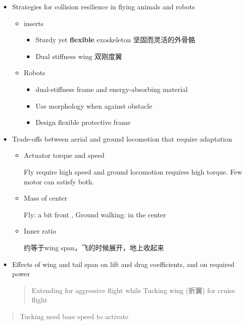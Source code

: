 \documentclass[]{article}
\begin{document}
\begin{itemize}
\item
  Strategies for collision resilience in flying animals and robots

  \begin{itemize}
  \item
    inserts

    \begin{itemize}
    \item
      Sturdy yet \textbf{flexible} exoskeleton \textbar{}
      坚固而灵活的外骨骼
    \item
      Dual stiffness wing \textbar{} 双刚度翼
    \end{itemize}
  \item
    Robots

    \begin{itemize}
    \item
      dual-stiffness frame and energy-absorbing material
    \item
      Use morphology when against obstacle
    \item
      Design flexible protective frame
    \end{itemize}
  \end{itemize}
\item
  Trade-offs between aerial and ground locomotion that require
  adaptation

  \begin{itemize}
  \item
    Actuator torque and speed

    Fly require high speed and ground locomotion requires high torque.
    Few motor can satisfy both.
  \item
    Mass of center

    Fly: a bit front , Ground walking: in the center
  \item
    Inner ratio

    约等于wing span，飞的时候展开，地上收起来
  \end{itemize}
\item
  Effects of wing and tail span on lift and drag coefficients, and on
  required power

  \begin{quote}
  Extending for aggressive flight while Tucking wing (折翼) for cruise
  flight
  \end{quote}
\end{itemize}

\begin{quote}
Tucking need base speed to activate
\end{quote}
\end{document}
